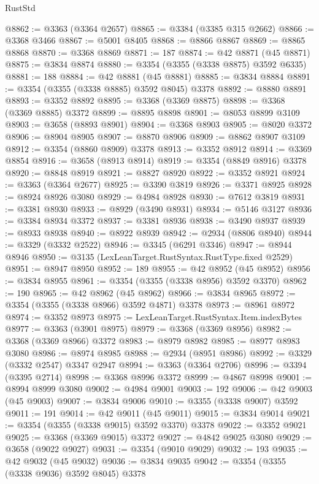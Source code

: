 \begin{lexlean}{RustStd}
\begin{coremodule}
@8862 := @3363 (@3364 @2657)
@8865 := @3384 (@3385 @315 @2662)
@8866 := @3368 @3466
@8867 := @5001 @8405
@8868 := @8866 @8867
@8869 := @8865 @8868
@8870 := @3368 @8869
@8871 := 187
@8874 := @42 @8871 (@45 @8871)
@8875 := @3834 @8874
@8880 := @3354 (@3355 (@3338 @8875) @3592 @6335)
@8881 := 188
@8884 := @42 @8881 (@45 @8881)
@8885 := @3834 @8884
@8891 := @3354 (@3355 (@3338 @8885) @3592 @8045) @3378
@8892 := @8880 @8891
@8893 := @3352 @8892
@8895 := @3368 (@3369 @8875)
@8898 := @3368 (@3369 @8885) @3372
@8899 := @8895 @8898
@8901 := @8053 @8899 @3109
@8903 := @3658 (@8893 @8901)
@8904 := @3368 @8903
@8905 := @8020 @3372
@8906 := @8904 @8905
@8907 := @8870 @8906
@8909 := @8862 @8907 @3109
@8912 := @3354 (@8860 @8909) @3378
@8913 := @3352 @8912
@8914 := @3369 @8854
@8916 := @3658 (@8913 @8914)
@8919 := @3354 (@8849 @8916) @3378
@8920 := @8848 @8919
@8921 := @8827 @8920
@8922 := @3352 @8921
@8924 := @3363 (@3364 @2677)
@8925 := @3390 @3819
@8926 := @3371 @8925
@8928 := @8924 @8926 @3080
@8929 := @4984 @8928
@8930 := @7612 @3819
@8931 := @3381 @8930
@8933 := @8929 (@3490 @8931)
@8934 := @5146 @3127
@8936 := @3384 @8934 @3372
@8937 := @3381 @8936
@8938 := @3490 @8937
@8939 := @8933 @8938
@8940 := @8922 @8939
@8942 := @2934 (@8806 @8940)
@8944 := @3329 (@3332 @2522)
@8946 := @3345 (@6291 @3346)
@8947 := @8944 @8946
@8950 := @3135 (LexLeanTarget.RustSyntax.RustType.fixed @2529)
@8951 := @8947 @8950
@8952 := 189
@8955 := @42 @8952 (@45 @8952)
@8956 := @3834 @8955
@8961 := @3354 (@3355 (@3338 @8956) @3592 @3370)
@8962 := 190
@8965 := @42 @8962 (@45 @8962)
@8966 := @3834 @8965
@8972 := @3354 (@3355 (@3338 @8966) @3592 @4871) @3378
@8973 := @8961 @8972
@8974 := @3352 @8973
@8975 := LexLeanTarget.RustSyntax.Item.indexBytes
@8977 := @3363 (@3901 @8975)
@8979 := @3368 (@3369 @8956)
@8982 := @3368 (@3369 @8966) @3372
@8983 := @8979 @8982
@8985 := @8977 @8983 @3080
@8986 := @8974 @8985
@8988 := @2934 (@8951 @8986)
@8992 := @3329 (@3332 @2547) @3347 @2947
@8994 := @3363 (@3364 @2706)
@8996 := @3394 (@3395 @2714)
@8998 := @3368 @8996 @3372
@8999 := @4867 @8998
@9001 := @8994 @8999 @3080
@9002 := @4984 @9001
@9003 := 192
@9006 := @42 @9003 (@45 @9003)
@9007 := @3834 @9006
@9010 := @3355 (@3338 @9007) @3592
@9011 := 191
@9014 := @42 @9011 (@45 @9011)
@9015 := @3834 @9014
@9021 := @3354 (@3355 (@3338 @9015) @3592 @3370) @3378
@9022 := @3352 @9021
@9025 := @3368 (@3369 @9015) @3372
@9027 := @4842 @9025 @3080
@9029 := @3658 (@9022 @9027)
@9031 := @3354 (@9010 @9029)
@9032 := 193
@9035 := @42 @9032 (@45 @9032)
@9036 := @3834 @9035
@9042 := @3354 (@3355 (@3338 @9036) @3592 @8045) @3378

\end{coremodule}
\end{lexlean}
